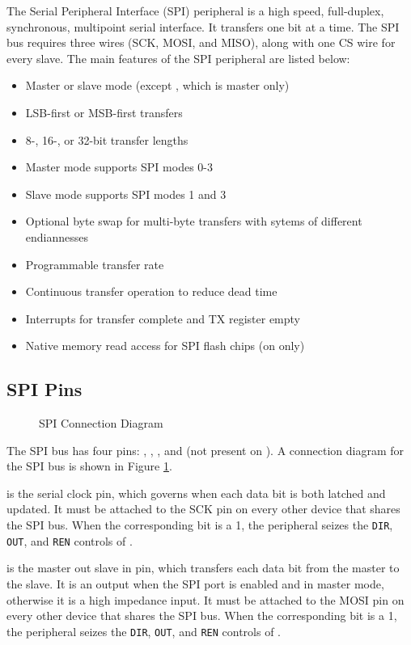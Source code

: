The Serial Peripheral Interface (SPI) peripheral is a high speed, full-duplex, synchronous, multipoint serial interface. It transfers one bit at a time. The SPI bus requires three wires (SCK, MOSI, and MISO), along with one CS wire for every slave. The main features of the SPI peripheral are listed below:

\begin{itemize}
	\item Master or slave mode (except , which is master only)
	\item LSB-first or MSB-first transfers
	\item 8-, 16-, or 32-bit transfer lengths
	\item Master mode supports SPI modes 0-3
	\item Slave mode supports SPI modes 1 and 3
	\item Optional byte swap for multi-byte transfers with sytems of different endiannesses
	\item Programmable transfer rate
	\item Continuous transfer operation to reduce dead time
	\item Interrupts for transfer complete and TX register empty
	\item Native memory read access for SPI flash chips (on  only)
\end{itemize}


\subsection{SPI Pins}

\begin{figure}[htpb]
	
	\caption{SPI Connection Diagram}
	\label{fig:spi-connection-diagram}
\end{figure}

The SPI bus has four pins: , , , and  (not present on ). A connection diagram for the SPI bus is shown in Figure \ref{fig:spi-connection-diagram}.

 is the serial clock pin, which governs when each data bit is both latched and updated. It must be attached to the SCK pin on every other device that shares the SPI bus. When the corresponding  bit is a 1, the  peripheral seizes the \texttt{DIR}, \texttt{OUT}, and \texttt{REN} controls of .

 is the master out slave in pin, which transfers each data bit from the master to the slave. It is an output when the SPI port is enabled and in master mode, otherwise it is a high impedance input. It must be attached to the MOSI pin on every other device that shares the SPI bus. When the corresponding  bit is a 1, the  peripheral seizes the \texttt{DIR}, \texttt{OUT}, and \texttt{REN} controls of .

